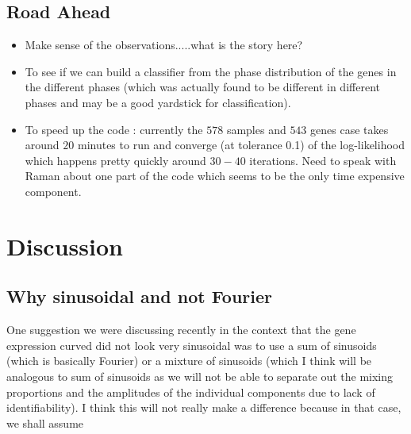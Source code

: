 \documentclass[11pt]{article}
\begin{document}
\subsection{Road Ahead}

\begin{itemize}

\item Make sense of the observations.....what is the story here?



\item To see if we can build a classifier from the phase distribution of the genes in the different phases (which was actually found to be different in different phases and may be a good yardstick for classification).

\item To speed up the code : currently the $578$ samples and $543$ genes case takes around $20$ minutes to run and converge (at tolerance 0.1) of the log-likelihood which happens pretty quickly around $30-40$ iterations. Need to speak with Raman about one part of the code which seems to be the only time expensive component.
\end{itemize}




\section{Discussion}

\subsection{Why sinusoidal and not Fourier}

One suggestion we were discussing recently in the context that the gene expression curved did not look very sinusoidal was to use  a sum of sinusoids (which is basically Fourier) or a mixture of sinusoids (which I think will be analogous to sum of sinusoids as we will not be able to separate out the mixing proportions and the amplitudes of the individual components due to lack of identifiability). I think this will not really make a difference because in that case, we shall assume 
\end{document}
